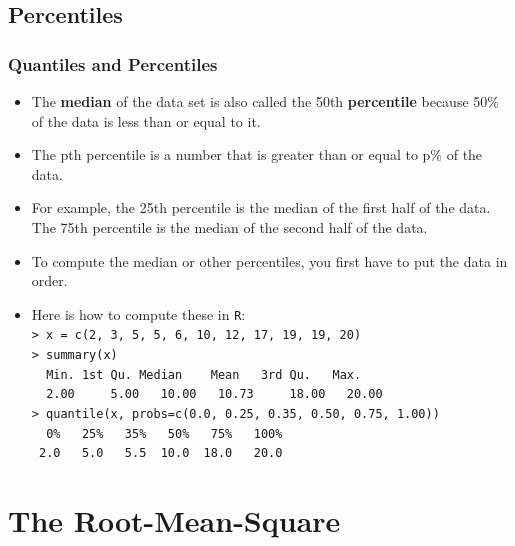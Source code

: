 \documentclass[t]{beamer}
\begin{document}
\subsection{Percentiles}
\begin{frame}
\frametitle{Quantiles and Percentiles}

\footnotesize
\begin{itemize}
\item The \textbf{median} of the data set is also called the 
    50th \textbf{percentile} because 50\% of the data is less than or equal to it.
\item The pth percentile is a number that is greater than or equal to  p\% of the data.
\item For example, the 25th percentile is the median of the first half of the data.\\
     The 75th percentile is the median of the second half of the data.
\item To compute the median or  other percentiles, you first have to put the data in order.
\item Here is how to compute these in \texttt{R}:\\[3pt]
\texttt{> x = c(2, 3, 5, 5, 6, 10, 12, 17, 19, 19, 20)}\\[3pt]
\texttt{> summary(x)}\\
\texttt{ \  Min.  1st Qu.  Median   \ \ \  Mean \ \  3rd Qu.   \ \ Max. }\\
\texttt{ \  2.00  \ \ \ \ 5.00   \ \ 10.00 \ \  10.73 \ \ \ \ 18.00  \ \ 20.00 }\\[3pt]
\texttt{> quantile(x, probs=c(0.0, 0.25, 0.35, 0.50, 0.75, 1.00))}\\
\texttt{ \ 0\% \ \ 25\%  \ \ 35\% \ \ 50\% \ \  75\%  \ \ 100\% }\\
\texttt{   2.0  \ \  5.0  \ \ 5.5 \  10.0 \   18.0 \ \    20.0 }
\end{itemize}

\end{frame}

\section[RMS]{The Root-Mean-Square}
\end{document}
